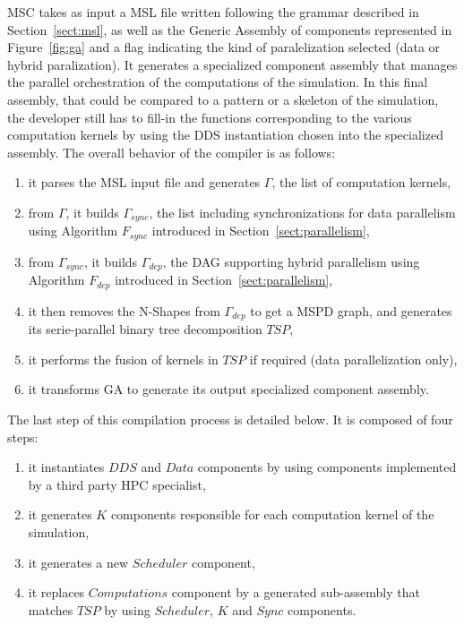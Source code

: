 MSC takes as input a MSL file written following the grammar described in Section~\ref{sect:msl}, as well as the Generic Assembly of components represented in Figure~\ref{fig:ga} and a flag indicating the kind of paralelization selected (data or hybrid paralization). It generates a specialized component assembly that manages the parallel orchestration of the computations of the simulation. In this final assembly, that could be compared to a pattern or a skeleton of the simulation, the developer still has to fill-in the functions corresponding to the various computation kernels by using the DDS instantiation chosen into the specialized assembly.
The overall behavior of the compiler is as follows: %
\begin{enumerate}
 \item it parses the MSL input file and generates $\Gamma$, the list of computation kernels,
 \item from $\Gamma$, it builds $\Gamma_{sync}$, the list including synchronizations for data parallelism using Algorithm $F_{sync}$ introduced in Section~\ref{sect:parallelism},
 \item from $\Gamma_{sync}$, it builds $\Gamma_{dep}$, the DAG supporting hybrid parallelism using Algorithm $F_{dep}$ introduced in Section~\ref{sect:parallelism},
 \item it then removes the N-Shapes from $\Gamma_{dep}$ to get a MSPD graph, and generates its serie-parallel binary tree decomposition $TSP$,
 \item it performs the fusion of kernels in $TSP$ if required (data parallelization only),
 \item it transforms GA to generate its output specialized component assembly.
\end{enumerate}

The last step of this compilation process is detailed below. It is composed of four steps:
\begin{enumerate}
 \item it instantiates $DDS$ and $Data$ components by using components implemented by a third party HPC specialist,
 \item it generates $K$ components responsible for each computation kernel of the simulation,
 \item it generates a new $Scheduler$ component,
 \item it replaces $Computations$ component by a generated sub-assembly that matches $TSP$ by using $Scheduler$, $K$ and $Sync$ components.
 \end{enumerate}

